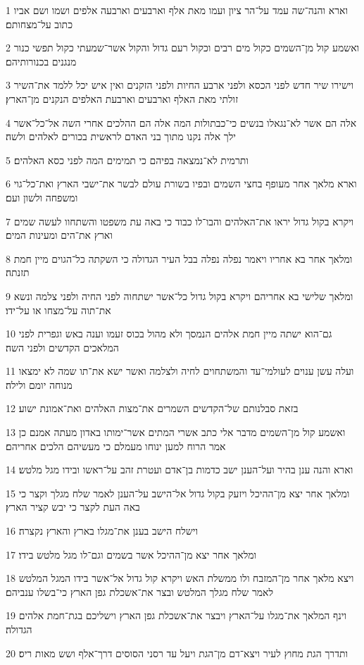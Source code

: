 \par 1 וארא והנה־שה עמד על־הר ציון ועמו מאת אלף וארבעים וארבעה אלפים ושמו ושם אביו כתוב על־מצחותם׃
\par 2 ואשמע קול מן־השמים כקול מים רבים וכקול רעם גדול והקול אשר־שמעתי כקול תפשי כנור מנגנים בכנורותיהם׃
\par 3 וישירו שיר חדש לפני הכסא ולפני ארבע החיות ולפני הזקנים ואין איש יכל ללמד את־השיר זולתי מאת האלף וארבעים וארבעת האלפים הנקנים מן־הארץ׃
\par 4 אלה הם אשר לא־נגאלו בנשים כי־כבתולות המה אלה הם ההלכים אחרי השה אל־כל־אשר ילך אלה נקנו מתוך בני האדם לראשית בכורים לאלהים ולשה׃
\par 5 ותרמית לא־נמצאה בפיהם כי תמימים המה לפני כסא האלהים׃
\par 6 וארא מלאך אחר מעופף בחצי השמים ובפיו בשורת עולם לבשר את־ישבי הארץ ואת־כל־גוי ומשפחה ולשון ועם׃
\par 7 ויקרא בקול גדול יראו את־האלהים והבו־לו כבוד כי באה עת משפטו והשתחוו לעשה שמים וארץ את־הים ומעינות המים׃
\par 8 ומלאך אחר בא אחריו ויאמר נפלה נפלה בבל העיר הגדולה כי השקתה כל־הגוים מיין חמת תזנתה׃
\par 9 ומלאך שלישי בא אחריהם ויקרא בקול גדול כל־אשר ישתחוה לפני החיה ולפני צלמה ונשא את־תוה על־מצחו או על־ידו׃
\par 10 גם־הוא ישתה מיין חמת אלהים הנמסך ולא מהול בכוס זעמו וענה באש וגפרית לפני המלאכים הקדשים ולפני השה׃
\par 11 ועלה עשן ענוים לעולמי־עד והמשתחוים לחיה ולצלמה ואשר ישא את־תו שמה לא ימצאו מנוחה יומם ולילה׃
\par 12 בזאת סבלנותם של־הקדשים השמרים את־מצות האלהים ואת־אמונת ישוע׃
\par 13 ואשמע קול מן־השמים מדבר אלי כתב אשרי המתים אשר־ימותו באדון מעתה אמנם כן אמר הרוח למען ינוחו מעמלם כי מעשיהם הלכים אחריהם׃
\par 14 וארא והנה ענן בהיר ועל־הענן ישב כדמות בן־אדם ועטרת זהב על־ראשו ובידו מגל מלטש׃
\par 15 ומלאך אחר יצא מן־ההיכל ויזעק בקול גדול אל־הישב על־הענן לאמר שלח מגלך וקצר כי באה העת לקצר כי יבש קציר הארץ׃
\par 16 וישלח הישב בענן את־מגלו בארץ והארץ נקצרה׃
\par 17 ומלאך אחר יצא מן־ההיכל אשר בשמים וגם־לו מגל מלטש בידו׃
\par 18 ויצא מלאך אחר מן־המזבח ולו ממשלת האש ויקרא קול גדול אל־אשר בידו המגל המלטש לאמר שלח מגלך המלטש ובצר את־אשכלת גפן הארץ כי־בשלו ענביהם׃
\par 19 וינף המלאך את־מגלו על־הארץ ויבצר את־אשכלת גפן הארץ וישליכם בגת־חמת אלהים הגדולה׃
\par 20 ותדרך הגת מחוץ לעיר ויצא־דם מן־הגת ויעל עד רסני הסוסים דרך־אלף ושש מאות ריס׃

